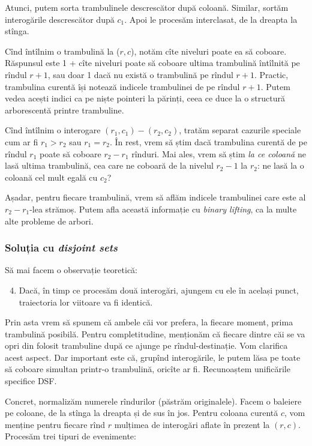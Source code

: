 Atunci, putem sorta trambulinele descrescător după coloană. Similar, sortăm interogările descrescător după $c_1$. Apoi le procesăm interclasat, de la dreapta la stînga.

Cînd întîlnim o trambulină la ($r,c$), notăm cîte niveluri poate ea să coboare. Răspunsul este 1 + cîte niveluri poate să coboare ultima trambulină întîlnită pe rîndul $r + 1$, sau doar 1 dacă nu există o trambulină pe rîndul $r + 1$. Practic, trambulina curentă își notează indicele trambulinei de pe rîndul $r + 1$. Putem vedea acești indici ca pe niște pointeri la părinți, ceea ce duce la o structură arborescentă printre trambuline.

Cînd întîlnim o interogare $(r_1,c_1)-(r_2,c_2)$, tratăm separat cazurile speciale cum ar fi $r_1 > r_2$ sau $r_1 = r_2$. În rest, vrem să știm dacă trambulina curentă de pe rîndul $r_1$ poate să coboare $r_2 - r_1$ rînduri. Mai ales, vrem să știm \textit{la ce coloană} ne lasă ultima trambulină, cea care ne coboară de la nivelul $r_2 - 1$ la $r_2$: ne lasă la o coloană cel mult egală cu $c_2$?

Așadar, pentru fiecare trambulină, vrem să aflăm indicele trambulinei care este al $r_2 - r_1$-lea strămoș. Putem afla această informație cu \textit{binary lifting}, ca la multe alte probleme de arbori.

\subsubsection*{Soluția cu \textit{disjoint sets}}

Să mai facem o observație teoretică:

\begin{enumerate}
  \setcounter{enumi}{3}
  \item Dacă, în timp ce procesăm două interogări, ajungem cu ele în același punct, traiectoria lor viitoare va fi identică.
\end{enumerate}

Prin asta vrem să spunem că ambele căi vor prefera, la fiecare moment, prima trambulină posibilă. Pentru completitudine, menționăm că fiecare dintre căi se va opri din folosit trambuline după ce ajunge pe rîndul-destinație. Vom clarifica acest aspect. Dar important este că, grupînd interogările, le putem lăsa pe toate să coboare simultan printr-o trambulină, oricîte ar fi. Recunoaștem unificările specifice DSF.

Concret, normalizăm numerele rîndurilor (păstrăm originalele). Facem o baleiere pe coloane, de la stînga la dreapta și de sus în jos. Pentru coloana curentă $c$, vom menține pentru fiecare rînd $r$ mulțimea de interogări aflate în prezent la $(r,c)$. Procesăm trei tipuri de evenimente:

